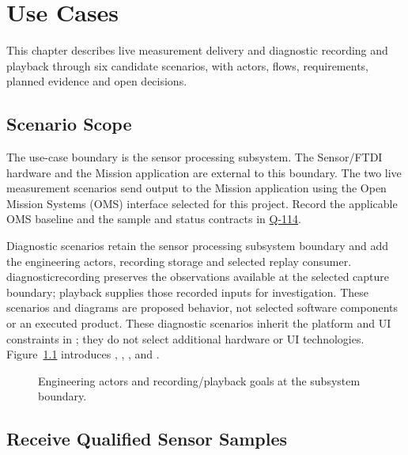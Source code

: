 \chapter{Use Cases}
\label{Section:UseCasesResponsibility}
This chapter describes live measurement delivery and diagnostic recording and playback through six candidate scenarios, with actors, flows, requirements, planned evidence and open decisions.

\section{Scenario Scope}
The use-case boundary is the sensor processing subsystem. The Sensor/FTDI
hardware and the Mission application are external to this boundary.
The two live measurement scenarios send output to the Mission application using the Open Mission
Systems (OMS) interface selected for this project. Record the applicable
OMS baseline and the sample and status contracts in
\hyperref[Question:Q-114]{Q-114}.


Diagnostic scenarios retain the sensor processing subsystem boundary and add the engineering actors, recording storage and selected replay consumer. \gls{diagnosticrecording} preserves the observations available at the selected capture boundary; \gls{playback} supplies those recorded inputs for investigation. These scenarios and diagrams are proposed behavior, not selected software components or an executed product. These diagnostic scenarios inherit the platform and UI constraints in ; they do not select additional hardware or UI technologies.
Figure~\ref{Figure:DiagnosticUseCases} introduces , , , and .
\begin{figure}[htbp]\centering
\resizebox{0.98\linewidth}{!}{}
\caption{Engineering actors and recording/playback goals at the subsystem boundary.}\label{Figure:DiagnosticUseCases}
\end{figure}

\section{Receive Qualified Sensor Samples}

